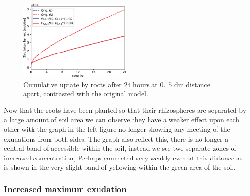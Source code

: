 \documentclass[11pt]{article}
\numberwithin{equation}{section}
\begin{document}
\begin{figure}[h]
    \centering
    \includegraphics[width=0.5\textwidth]{Figures/testpics/ZnCumulative/IncreasedDistanceCumuZn.eps}
    \caption{Cumulative  uptate by roots after 24 hours at $0.15$ \si{dm} distance apart, contrasted with the original model.}
\end{figure}
 Now that the roots have been planted so that their rhizospheres are separated by a large amount of soil area we can observe they have a weaker effect upon each other with the  graph in the left figure no longer showing any meeting of the exudations from both sides. The  graph also reflect this, there is no longer a central band of accessible  within the soil, instead we see two separate zones of increased  concentration, Perhaps connected very weakly even at this distance as is shown in the very slight band of yellowing within the green area of the soil.
\subsubsection{Increased maximum  exudation}
\end{document}
